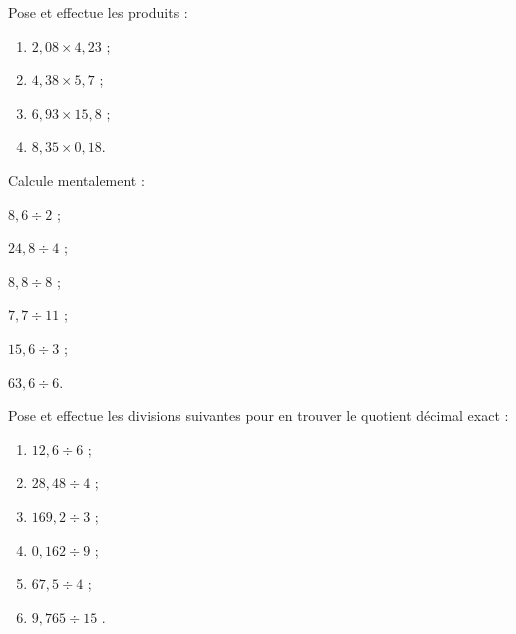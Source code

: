\begin{exercice}
Pose et effectue les produits :
\begin{enumerate} 
 \item $2,08 \times 4,23$ \dotfill ; 
 
 \item $4,38 \times 5,7$ \dotfill ; 
 
 \item $6,93 \times 15,8$ \dotfill ; 
 
 \item $8,35 \times 0,18 $\dotfill.  
 \end{enumerate}
\end{exercice}
\begin{exercice} 
Calcule mentalement :
\begin{colenumerate}{2}
 \item $ 8,6 \div 2$ ;
 \item $ 24,8 \div 4$ ;
 \item $ 8,8 \div 8$ ;
 \item $ 7,7 \div 11$ ;
 \item $ 15,6 \div 3$ ;
 \item $ 63,6 \div 6$.
 \end{colenumerate}
\end{exercice}
\begin{exercice} 
Pose et effectue les divisions suivantes pour en trouver le quotient décimal exact :
\begin{enumerate} 
 \item $ 12,6 \div 6$ \dotfill ; 
 
 \item $ 28,48 \div 4$ \dotfill ; 
 \item $ 169,2 \div 3$ \dotfill ; 
 \item $ 0,162 \div 9$ \dotfill ; 
 \item $ 67,5 \div 4$ \dotfill ; 
 \item $ 9,765 \div 15$ \dotfill. 
 \end{enumerate}
\end{exercice}
